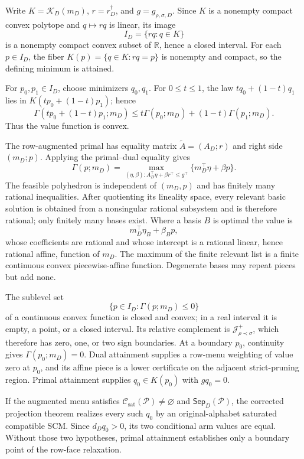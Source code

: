 Write \(K=\mathcal K_D(m_D)\), \(r=r_D^\dagger\), and \(g=g_{\rho,\sigma,D}\).  Since \(K\) is a nonempty compact convex polytope and \(q\mapsto rq\) is linear, its image
\[
I_D=\{rq:q\in K\}
\]
is a nonempty compact convex subset of \(\mathbb R\), hence a closed interval.  For each \(p\in I_D\), the fiber \(K(p)=\{q\in K:rq=p\}\) is nonempty and compact, so the defining minimum is attained.

For \(p_0,p_1\in I_D\), choose minimizers \(q_0,q_1\).  For \(0\leq t\leq1\), the law \(tq_0+(1-t)q_1\) lies in \(K(tp_0+(1-t)p_1)\); hence
\[
\Gamma(tp_0+(1-t)p_1;m_D)
\leq t\Gamma(p_0;m_D)+(1-t)\Gamma(p_1;m_D).
\]
Thus the value function is convex.

The row-augmented primal has equality matrix \(\widetilde A=(A_D;r)\) and right side \((m_D;p)\).  Applying the primal--dual equality gives
\[
\Gamma(p;m_D)
=\max_{(\eta,\beta):A_D^\top\eta+\beta r^\top\leq g^\top}
\{m_D^\top\eta+\beta p\}.
\]
The feasible polyhedron is independent of \((m_D,p)\) and has finitely many rational inequalities.  After quotienting its lineality space, every relevant basic solution is obtained from a nonsingular rational subsystem and is therefore rational; only finitely many bases exist.  Where a basis \(B\) is optimal the value is
\[
m_D^\top\eta_B+\beta_Bp,
\]
whose coefficients are rational and whose intercept is a rational linear, hence rational affine, function of \(m_D\).  The maximum of the finite relevant list is a finite continuous convex piecewise-affine function.  Degenerate bases may repeat pieces but add none.

The sublevel set
\[
\{p\in I_D:\Gamma(p;m_D)\leq0\}
\]
of a continuous convex function is closed and convex; in a real interval it is empty, a point, or a closed interval.  Its relative complement is \(\mathcal J_{\rho\prec\sigma}^+\), which therefore has zero, one, or two sign boundaries.  At a boundary \(p_0\), continuity gives \(\Gamma(p_0;m_D)=0\).  Dual attainment supplies a row-menu weighting of value zero at \(p_0\), and its affine piece is a lower certificate on the adjacent strict-pruning region.  Primal attainment supplies \(q_0\in K(p_0)\) with \(gq_0=0\).

If the augmented menu satisfies \(\mathcal C_{\mathrm{sat}}(\mathcal P)\ne\varnothing\) and \(\mathsf{Sep}_D(\mathcal P)\), the corrected projection theorem realizes every such \(q_0\) by an original-alphabet saturated compatible SCM.  Since \(d_Dq_0>0\), its two conditional arm values are equal.  Without those two hypotheses, primal attainment establishes only a boundary point of the row-face relaxation.